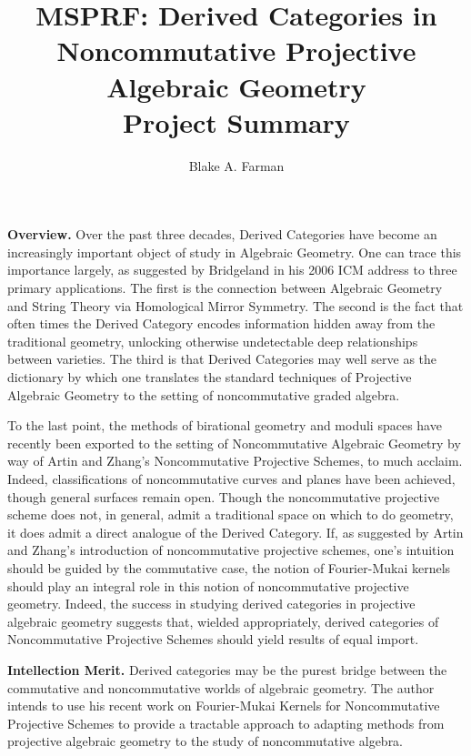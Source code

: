 \documentclass[11pt]{article}
\title{MSPRF: Derived Categories in Noncommutative Projective Algebraic Geometry\\\small{Project Summary}}
\author{Blake A. Farman}
\date{}
\begin{document}
\maketitle

\noindent\textbf{Overview.}
Over the past three decades, Derived Categories have become an increasingly important object of study in Algebraic Geometry.
One can trace this importance largely, as suggested by Bridgeland in his 2006 ICM address to three primary applications.
The first is the connection between Algebraic Geometry and String Theory via Homological Mirror Symmetry.
The second is the fact that often times the Derived Category encodes information hidden away from the traditional geometry, unlocking otherwise undetectable deep relationships between varieties.
The third is that Derived Categories may well serve as the dictionary by which one translates the standard techniques of Projective Algebraic Geometry to the setting of noncommutative graded algebra.

To the last point, the methods of birational geometry and moduli spaces have recently been exported to the setting of Noncommutative Algebraic Geometry by way of Artin and Zhang's Noncommutative Projective Schemes, to much acclaim.
Indeed, classifications of noncommutative curves and planes have been achieved, though general surfaces remain open.
Though the noncommutative projective scheme does not, in general, admit a traditional space on which to do geometry, it does admit a direct analogue of the Derived Category.
If, as suggested by Artin and Zhang's introduction of noncommutative projective schemes, one's intuition should be guided by the commutative case, the notion of Fourier-Mukai kernels should play an integral role in this notion of noncommutative projective geometry.
Indeed, the success in studying derived categories in projective algebraic geometry suggests that, wielded appropriately, derived categories of Noncommutative Projective Schemes should yield results of equal import.



\noindent\textbf{Intellection Merit.}
Derived categories may be the purest bridge between the commutative and noncommutative worlds of algebraic geometry.
The author intends to use his recent work on Fourier-Mukai Kernels for Noncommutative Projective Schemes to provide a tractable approach to adapting methods from projective algebraic geometry to the study of noncommutative algebra.
\end{document}

